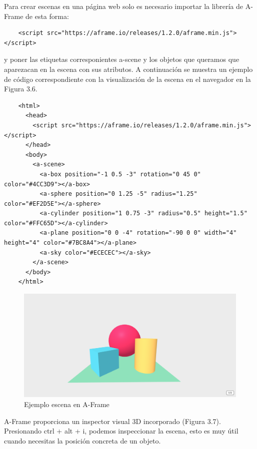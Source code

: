 Para crear escenas en una página web solo es necesario importar la librería de A-Frame de esta forma: \begin{lstlisting}
    <script src="https://aframe.io/releases/1.2.0/aframe.min.js"></script>
\end{lstlisting} 
y poner las etiquetas corresponientes a-scene y los objetos que queramos que aparezacan en la escena con sus atributos.
A continuación se muestra un ejemplo de código correspondiente con la visualización de la escena en el navegador en la Figura 3.6.
\\
\begin{lstlisting}
    <html>
      <head>
        <script src="https://aframe.io/releases/1.2.0/aframe.min.js"></script>
      </head>
      <body>
        <a-scene>
          <a-box position="-1 0.5 -3" rotation="0 45 0" color="#4CC3D9"></a-box>
          <a-sphere position="0 1.25 -5" radius="1.25" color="#EF2D5E"></a-sphere>
          <a-cylinder position="1 0.75 -3" radius="0.5" height="1.5" color="#FFC65D"></a-cylinder>
          <a-plane position="0 0 -4" rotation="-90 0 0" width="4" height="4" color="#7BC8A4"></a-plane>
          <a-sky color="#ECECEC"></a-sky>
        </a-scene>
      </body>
    </html>
\end{lstlisting}

\begin{figure}[H]
    \centering
    \includegraphics[width=1\textwidth, height=0.5\textwidth]{chapters/images/aframe.png}
    \caption{Ejemplo escena en A-Frame}
    \label{fig:my_label}
\end{figure}

A-Frame proporciona un inspector visual 3D incorporado (Figura 3.7). Presionando ctrl + alt + i, podemos inspeccionar la escena, esto es muy útil cuando necesitas la posición concreta de un objeto.

